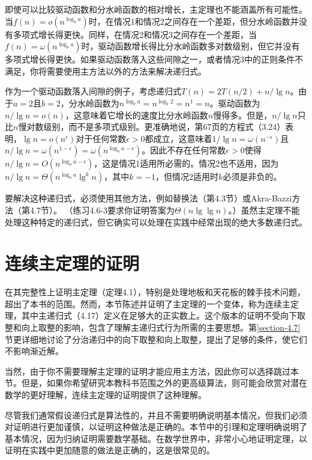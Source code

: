 \documentclass[lang=cn,newtx,10pt,scheme=chinese]{elegantbook}
\begin{document}
即使可以比较驱动函数和分水岭函数的相对增长，主定理也不能涵盖所有可能性。当$f(n)=o\left(n^{\log _b a}\right)$时，在情况1和情况2之间存在一个差距，但分水岭函数并没有多项式增长得更快。同样，在情况2和情况3之间存在一个差距，当$f(n)=\omega\left(n^{\log _b a}\right)$时，驱动函数增长得比分水岭函数多对数级别，但它并没有多项式增长得更快。如果驱动函数落入这些间隙之一，或者情况3中的正则条件不满足，你将需要使用主方法以外的方法来解决递归式。

作为一个驱动函数落入间隙的例子，考虑递归式$T(n)=2 T(n / 2)+n / \lg n$。由于$a=2$且$b=2$，分水岭函数为$n^{\log _b a}=n^{\log _2 2}=n^1=n$。驱动函数为$n / \lg n=o(n)$，这意味着它增长的速度比分水岭函数$n$慢得多。但是，$n / \lg n$只比$n$慢对数级别，而不是多项式级别。更准确地说，第67页的方程式（3.24）表明，$\lg n=o\left(n^\epsilon\right)$对于任何常数$\epsilon>0$都成立，这意味着$1 / \lg n=\omega\left(n^{-\epsilon}\right)$且$n / \lg n=\omega\left(n^{1-\epsilon}\right)=\omega\left(n^{\log _b a-\epsilon}\right)$。因此不存在任何常数$\epsilon>0$使得$n / \lg n=O\left(n^{\log _b a-\epsilon}\right)$，这是情况1适用所必需的。情况2也不适用，因为$n / \lg n=\Theta\left(n^{\log _b a} \lg ^k n\right)$，其中$k=-1$，但情况2适用时$k$必须是非负的。

要解决这种递归式，必须使用其他方法，例如替换法（第4.3节）或Akra-Bazzi方法（第4.7节）。 （练习4.6-3要求你证明答案为$\Theta(n \lg \lg n)$。）虽然主定理不能处理这种特定的递归式，但它确实可以处理在实践中经常出现的绝大多数递归式。

\section{连续主定理的证明}\label{section-4.6}

在其完整性上证明主定理（定理4.1），特别是处理地板和天花板的棘手技术问题，超出了本书的范围。然而，本节陈述并证明了主定理的一个变体，称为连续主定理，其中主递归式（4.17）定义在足够大的正实数上。这个版本的证明不受向下取整和向上取整的影响，包含了理解主递归式行为所需的主要思想。第\ref{section-4.7}节更详细地讨论了分治递归中的向下取整和向上取整，提出了足够的条件，使它们不影响渐近解。

当然，由于你不需要理解主定理的证明才能应用主方法，因此你可以选择跳过本节。但是，如果你希望研究本教科书范围之外的更高级算法，则可能会欣赏对潜在数学的更好理解，连续主定理的证明提供了这种理解。

尽管我们通常假设递归式是算法性的，并且不需要明确说明基本情况，但我们必须对证明进行更加谨慎，以证明这种做法是正确的。本节中的引理和定理明确说明了基本情况，因为归纳证明需要数学基础。在数学世界中，非常小心地证明定理，以证明在实践中更加随意的做法是正确的，这是很常见的。
\end{document}
